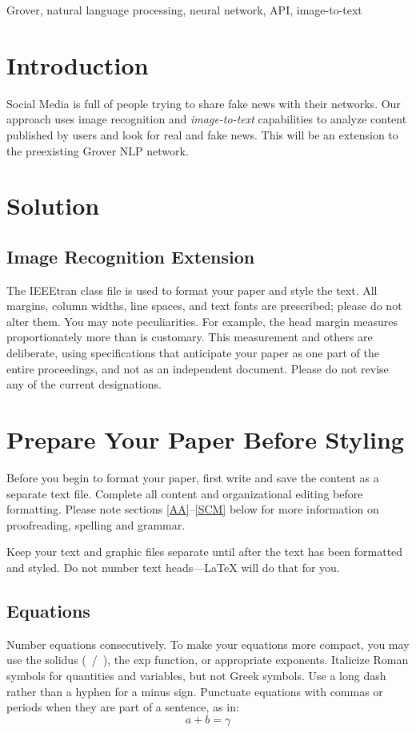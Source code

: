 \documentclass[conference]{IEEEtran}
\begin{document}
\begin{IEEEkeywords}
Grover, natural language processing, neural network, API, image-to-text
\end{IEEEkeywords}

\section{Introduction}
Social Media is full of people trying to share fake news with their networks. Our approach uses image recognition and \emph{image-to-text} capabilities to analyze content published by users and look for real and fake news. This will be an extension to the preexisting Grover NLP network. 

\section{Solution}

\subsection{Image Recognition Extension}

The IEEEtran class file is used to format your paper and style the text. All margins, 
column widths, line spaces, and text fonts are prescribed; please do not 
alter them. You may note peculiarities. For example, the head margin
measures proportionately more than is customary. This measurement 
and others are deliberate, using specifications that anticipate your paper 
as one part of the entire proceedings, and not as an independent document. 
Please do not revise any of the current designations.

\section{Prepare Your Paper Before Styling}
Before you begin to format your paper, first write and save the content as a 
separate text file. Complete all content and organizational editing before 
formatting. Please note sections \ref{AA}--\ref{SCM} below for more information on 
proofreading, spelling and grammar.

Keep your text and graphic files separate until after the text has been 
formatted and styled. Do not number text heads---{\LaTeX} will do that 
for you.

\subsection{Equations}
Number equations consecutively. To make your 
equations more compact, you may use the solidus (~/~), the exp function, or 
appropriate exponents. Italicize Roman symbols for quantities and variables, 
but not Greek symbols. Use a long dash rather than a hyphen for a minus 
sign. Punctuate equations with commas or periods when they are part of a 
sentence, as in:
\begin{equation}
a+b=\gamma\label{eq}
\end{equation}
\end{document}
